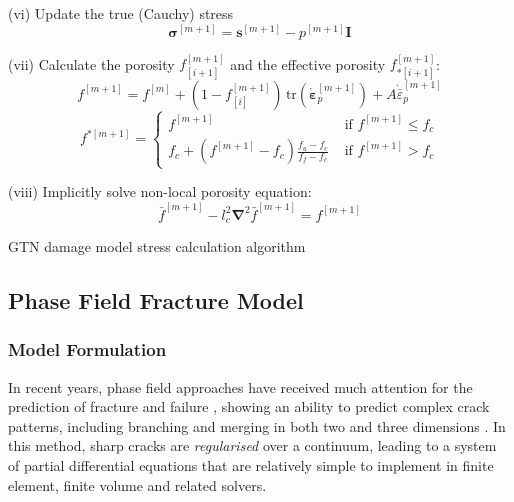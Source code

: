 \documentclass[sn-mathphys,Numbered]{sn-jnl}%
\newcommand{\bb}{\boldsymbol}
\begin{document}
\begin{algorithm}[htbp]
(vi) Update the true (Cauchy) stress
\begin{equation}
	\boldsymbol{\sigma}^{[m+1]} = \boldsymbol{s}^{[m+1]} -  p^{[m+1]}\textbf{I} \nonumber
\end{equation}


(vii) Calculate the porosity $f_{[i+1]}^{[m+1]}$ and the effective porosity $f_{*[i+1]}^{[m+1]}$:
\begin{equation}
	f^{[m+1]} = f^{[m]} + \left(1 - f^{[m+1]}_{[i]}\right) \, \text{tr}\left(\dot{\boldsymbol{\varepsilon}}^{[m+1]}_p\right)
	+ A \dot{\bar{\varepsilon}}^{[m+1]}_p
\end{equation}
\begin{equation}
	f^{*[m+1]} =
	\left\{
	\begin{array}{ll}
		f^{[m+1]}  & \text { if } f^{[m+1]}  \leq f_c \\
		f_c + \left(f^{[m+1]} - f_c\right) \frac{f_u - f_c}{f_f - f_c} & \text { if } f^{[m+1]}  > f_c
	\end{array}\right.
\end{equation}


(viii) Implicitly solve non-local porosity equation:
\begin{equation}
	\bar{f}^{[m+1]} -  l_c^2 \bb{\nabla}^2 \bar{f}^{[m+1]} = f^{[m+1]}
\end{equation}

\caption{GTN damage model stress calculation algorithm}
\end{algorithm}






\subsection{Phase Field Fracture Model}

\subsubsection{Model Formulation}
In recent years, phase field approaches have received much attention for the prediction of fracture and failure \cite{borden_phase-field_2012, miehe_phase_2010, ambati_phase-field_2015, borden_phase-field_2016, miehe_phase_2016, dittmann_variational_2018, samaniego_phase-field_2021}, showing an ability to predict complex crack patterns, including branching and merging in both two and three dimensions \cite{borden_phase-field_2012, miehe_phase_2010}.
In this method, sharp cracks are \emph{regularised} over a continuum, leading to a system of partial differential equations that are relatively simple to implement in finite element, finite volume and related solvers.
\end{document}

